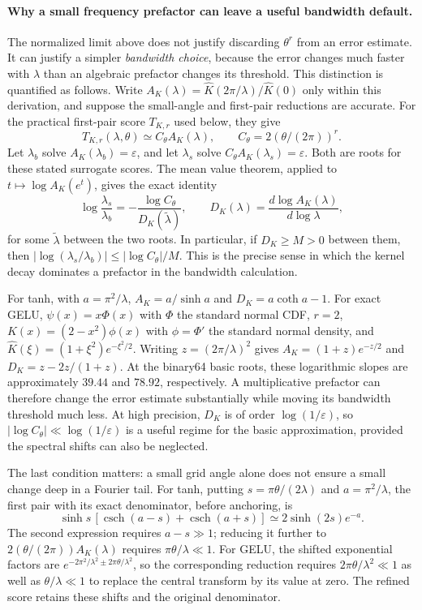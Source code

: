 \documentclass[11pt]{article}
\begin{document}
\paragraph{Why a small frequency prefactor can leave a useful bandwidth default.}
The normalized limit above does not justify discarding $\theta^r$ from an
error estimate. It can justify a simpler \emph{bandwidth choice}, because
the error changes much faster with $\lambda$ than an algebraic prefactor
changes its threshold. This distinction is quantified as follows.
Write $A_K(\lambda)=\widehat K(2\pi/\lambda)/\widehat K(0)$ only within
this derivation, and suppose the small-angle and first-pair reductions are
accurate. For the practical first-pair score $T_{K,r}$ used below, they give
\[
 T_{K,r}(\lambda,\theta)\simeq C_\theta A_K(\lambda),
 \qquad C_\theta=2(\theta/(2\pi))^r.
\]
Let $\lambda_b$ solve $A_K(\lambda_b)=\varepsilon$, and let
$\lambda_s$ solve $C_\theta A_K(\lambda_s)=\varepsilon$.
Both are roots for these stated surrogate scores. The mean value theorem,
applied to $t\mapsto\log A_K(e^t)$, gives the exact identity
\begin{equation}
 \log\frac{\lambda_s}{\lambda_b}
 =-\frac{\log C_\theta}{D_K(\widetilde\lambda)},\qquad
 D_K(\lambda)=\frac{d\log A_K(\lambda)}{d\log\lambda},
 \label{eq:lambda-log-sensitivity}
\end{equation}
for some $\widetilde\lambda$ between the two roots. In particular, if
$D_K\ge M>0$ between them, then
$|\log(\lambda_s/\lambda_b)|\le|\log C_\theta|/M$.
This is the precise sense in which the kernel decay dominates a prefactor
in the bandwidth calculation.

For tanh, with $a=\pi^2/\lambda$,
$A_K=a/\sinh a$ and $D_K=a\coth a-1$.
For exact GELU, $\psi(x)=x\Phi(x)$ with $\Phi$ the standard normal CDF,
$r=2$, $K(x)=(2-x^2)\phi(x)$ with $\phi=\Phi'$ the standard normal density, and $\widehat K(\xi)=(1+\xi^2)e^{-\xi^2/2}$.
Writing $z=(2\pi/\lambda)^2$ gives $A_K=(1+z)e^{-z/2}$ and
$D_K=z-2z/(1+z)$.
At the binary64 basic roots, these logarithmic slopes are approximately
$39.44$ and $78.92$, respectively. A multiplicative prefactor can therefore
change the error estimate substantially while moving its bandwidth
threshold much less. At high precision, $D_K$ is of order
$\log(1/\varepsilon)$, so
$|\log C_\theta|\ll\log(1/\varepsilon)$ is a useful regime for the basic
approximation, provided the spectral shifts can also be neglected.

The last condition matters: a small grid angle alone does not ensure a
small change deep in a Fourier tail. For tanh, putting
$s=\pi\theta/(2\lambda)$ and $a=\pi^2/\lambda$, the first pair with its
exact denominator, before anchoring, is
\[
 \sinh s\,[\operatorname{csch}(a-s)+\operatorname{csch}(a+s)]
 \simeq2\sinh(2s)e^{-a}.
\]
The second expression requires $a-s\gg1$; reducing it further to
$2(\theta/(2\pi))A_K(\lambda)$ requires $\pi\theta/\lambda\ll1$.
For GELU, the shifted exponential factors are
$e^{-2\pi^2/\lambda^2\pm2\pi\theta/\lambda^2}$, so the corresponding
reduction requires $2\pi\theta/\lambda^2\ll1$ as well as
$\theta/\lambda\ll1$ to replace the central transform by its value at zero.
The refined score retains these shifts and the original denominator.
\end{document}
